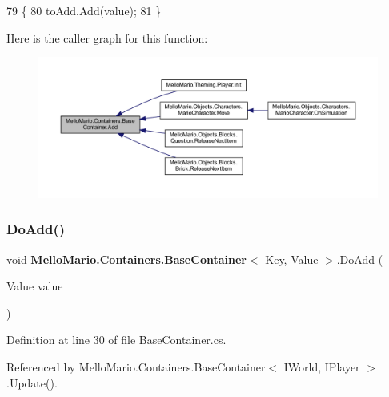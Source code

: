 \begin{DoxyCode}
79         \{
80             toAdd.Add(value);
81         \}
\end{DoxyCode}
Here is the caller graph for this function\+:
\nopagebreak
\begin{figure}[H]
\begin{center}
\leavevmode
\includegraphics[width=350pt]{classMelloMario_1_1Containers_1_1BaseContainer_a09791801b12923f7b6b7e83decfbe997_icgraph}
\end{center}
\end{figure}
\mbox{\label{classMelloMario_1_1Containers_1_1BaseContainer_abc43a2536f5d915137b83e3181cabce7}} 
\subsubsection{Do\+Add()}
{\footnotesize\ttfamily void \textbf{ Mello\+Mario.\+Containers.\+Base\+Container}$<$ Key, Value $>$.Do\+Add (\begin{DoxyParamCaption}\item[{Value}]{value }\end{DoxyParamCaption})\hspace{0.3cm}{\ttfamily [private]}}



Definition at line 30 of file Base\+Container.\+cs.



Referenced by Mello\+Mario.\+Containers.\+Base\+Container$<$ I\+World, I\+Player $>$.\+Update().


